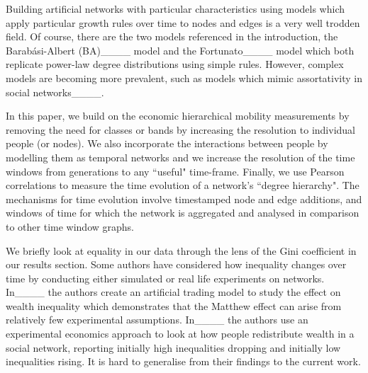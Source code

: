 Building artificial networks with particular characteristics using models which apply particular growth rules over time to nodes and edges is a very well trodden field. Of course, there are the two models referenced in the introduction, the Barab\'{a}si-Albert (BA)____ model and the Fortunato____ model which both replicate power-law degree distributions using simple rules. However, complex models are becoming more prevalent, such as models which mimic assortativity in social networks____.

In this paper, we build on the economic hierarchical mobility measurements by removing the need for classes or bands by increasing the resolution to individual people (or nodes). We also incorporate the interactions between people by modelling them as temporal networks and we increase the resolution of the time windows from generations to any ``useful" time-frame. Finally, we use Pearson correlations to measure the time evolution of a network's ``degree hierarchy". The mechanisms for time evolution involve timestamped node and edge additions, and windows of time for which the network is aggregated and analysed in comparison to other time window graphs.

We briefly look at equality in our data through the lens of the Gini coefficient in our results section. Some authors have considered how inequality changes over time by conducting either simulated or real life experiments on networks. In____ the authors create an artificial trading model to study the effect on wealth inequality which demonstrates that the Matthew effect can arise from relatively few experimental assumptions. 
In____ the authors use an experimental economics approach to look at how people redistribute wealth in a social network, reporting initially high inequalities dropping and initially low inequalities rising. It is hard to generalise from their findings to the current work.